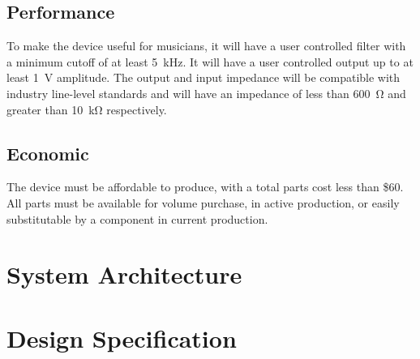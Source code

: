 \documentclass[11pt]{report}
\begin{document}
	\subsection{Performance}
		To make the device useful for musicians, it will have a user controlled filter with a minimum cutoff of at least \SI{5}{\kilo\hertz}. It will have a user controlled output up to at least \SI{1}{\volt} amplitude. The output and input impedance will be compatible with industry line-level standards and will have an impedance of less than \SI{600}{\ohm} and greater than \SI{10}{\kilo\ohm} respectively. 
	\subsection{Economic}
	The device must be affordable to produce, with a total parts cost less than \$60. All parts must be available for volume purchase, in active production, or easily substitutable by a component in current production. 
\section{System Architecture}
\section{Design Specification}
\end{document}
